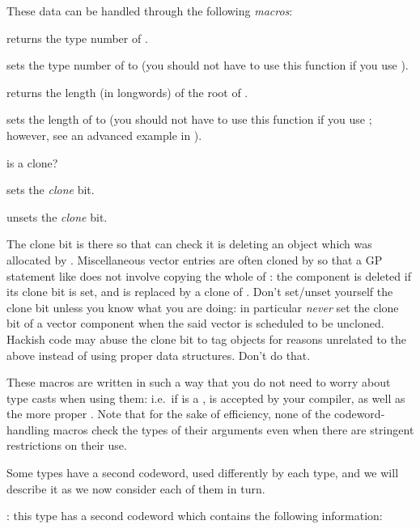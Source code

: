 \noindent These data can be handled through the following \emph{macros}:

 returns the type number of .

 sets the type number of  to
 (you should not have to use this function if you use ).

 returns the length (in longwords) of the root of .

 sets the length of  to  (you
should not have to use this function if you use ; however, see
an advanced example in ).

 is  a clone?

 sets the \emph{clone} bit.

 unsets the \emph{clone} bit.

 The clone bit is there so that  can check
it is deleting an object which was allocated by . Miscellaneous
vector entries are often cloned by  so that a GP statement like
 does not involve copying the whole of : the component
 is deleted if its clone bit is set, and is replaced by a clone of
. Don't set/unset yourself the clone bit unless you know what you are
doing: in particular \emph{never} set the clone bit of a vector component
when the said vector is scheduled to be uncloned. Hackish code may abuse the
clone bit to tag objects for reasons unrelated to the above instead of using
proper data structures. Don't do that.

These macros are written in such a way that you do not need to worry about
type casts when using them: i.e.~if  is a , 
is accepted by your compiler, as well as the more proper .
Note that for the sake of efficiency, none of the codeword-handling macros
check the types of their arguments even when there are stringent restrictions
on their use.

Some types have a second codeword, used differently by each type, and
we will describe it as we now consider each of them in turn.

: this type has
a second codeword  which contains the following information:

